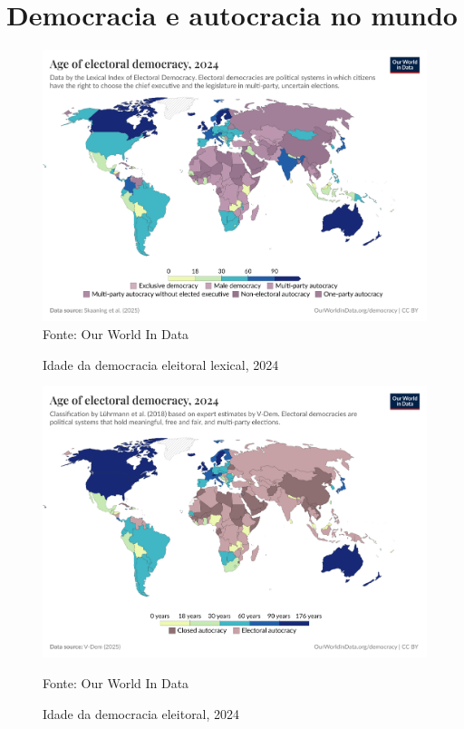 \section{Democracia e autocracia no mundo}

\begin{figure}
    \centering
    \caption{Idade da democracia eleitoral lexical, 2024}
    \includegraphics[width=1\linewidth]{figuras/democracia/age-of-electoral-democracy-lexical.png}
    \label{fig:age-of-electoral-democracy-lexical}
    \footnotesize{Fonte: Our World In Data}
\end{figure}

\begin{figure}
    \centering
    \includegraphics[width=1\linewidth]{figuras/democracia/age-of-electoral-democracy.png}
    \caption{Idade da democracia eleitoral, 2024}
    \label{fig:age-of-electoral-democracy}
    \footnotesize{Fonte: Our World In Data}
\end{figure}


